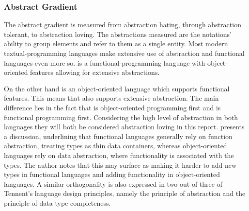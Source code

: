 \subsubsection{Abstract Gradient}\label{sec:our-abstract-gradient}
The abstract gradient is measured from abstraction hating, through abstraction tolerant, to abstraction loving. The abstractions measured are the notations' ability to group elements and refer to them as a single entity. Most modern textual-programming languages make extensive use of abstraction and functional languages even more so\cite{hudak1989conception}. \fs is a functional-programming language with object-oriented features allowing for extensive abstractions.

On the other hand \cs is an object-oriented language which supports functional features. This means that \cs also supports extensive abstraction. The main difference lies in the fact that \cs is object-oriented programming first and \fs is functional programming first. %
Considering the high level of abstraction in both languages they will both be considered abstraction loving in this report. \cite{bendersky:abstraction} presents a discussion, underlining that functional languages generally rely on function abstraction, treating types as thin data containers, whereas object-oriented languages rely on data abstraction, where functionality is associated with the types. The author notes that this may surface as making it harder to add new types in functional languages and adding functionality in object-oriented languages. A similar orthogonality is also expressed in two out of three of Tennent's language design principles\cite{tennent1977language}, namely the principle of abstraction and the principle of data type completeness.

